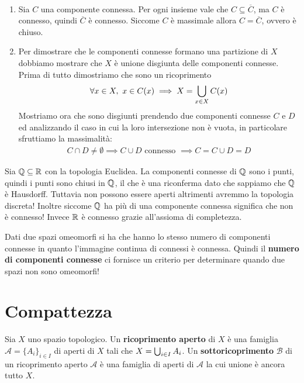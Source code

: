 \begin{demonstration}
	~{}
	\begin{enumerate}[label=\Roman*]
		\item Sia $C$ una componente connessa. Per ogni insieme vale che $C\subseteq\overline{C}$, ma $C$ è connesso, quindi $\overline{C}$ è connesso. Siccome $C$ è massimale allora $C=\overline{C}$, ovvero è chiuso.
		\item Per dimostrare che le componenti connesse formano una partizione di $X$ dobbiamo mostrare che $X$ è unione disgiunta delle componenti connesse. Prima di tutto dimostriamo che sono un ricoprimento
			\begin{equation*}
				\forall x\in X,\ x\in C(x) \implies X=\union_{x\in X}C(x)
			\end{equation*}
		Mostriamo ora che sono disgiunti prendendo due componenti connesse $C$ e $D$ ed analizzando il caso in cui la loro intersezione non è vuota, in particolare sfruttiamo la massimalità:
		\begin{gather*}
			C\cap D\neq\emptyset \implies C\cup D \text{ connesso } \implies C=C\cup D=D
		\end{gather*}
	\end{enumerate}
\end{demonstration}
\begin{example}
	Sia $\mathbb{Q}\subseteq\mathbb{R}$ con la topologia Euclidea. La componenti connesse di $\mathbb{Q}$ sono i punti, quindi i punti sono chiusi in $\mathbb{Q}$, il che è una riconferma dato che sappiamo che $\mathbb{Q}$ è Hausdorff. Tuttavia non possono essere aperti altrimenti avremmo la topologia discreta!\newline
	Inoltre siccome $\mathbb{Q}$ ha più di una componente connessa significa che non è connesso! Invece $\mathbb{R}$ è connesso grazie all'assioma di completezza.
\end{example}
\begin{observe}
	Dati due spazi omeomorfi si ha che hanno lo stesso numero di componenti connesse in quanto l'immagine continua di connessi è connessa. Quindi il \textbf{numero di componenti connesse} ci fornisce un criterio per determinare quando due spazi non sono omeomorfi!
\end{observe}


		\section{Compattezza}
		
\begin{define}
	Sia $X$ uno spazio topologico. Un \textbf{ricoprimento aperto} di $X$ è una famiglia $\mathcal{A}=\{A_i \}_{i\in I}$ di aperti di $X$ tali che $X=\mathop{{\bigcup}}\displaylimits_{i\in I} A_i$. \newline
	Un \textbf{sottoricoprimento} $\mathcal{B}$ di un ricoprimento aperto $\mathcal{A}$ è una famiglia di aperti di $\mathcal{A}$ la cui unione è ancora tutto $X$.
\end{define}		

